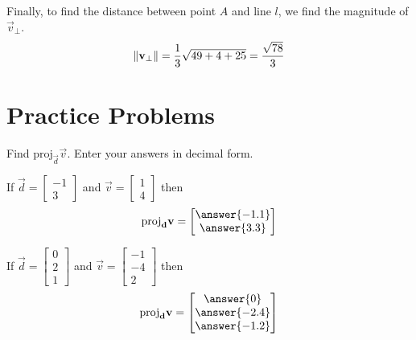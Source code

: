\documentclass{ximera}
\begin{document}
\begin{example}
\begin{explanation}
\begin{image}[2in]
\end{image}


Finally, to find the distance between point $A$ and line $l$, we find the magnitude of $\vec{v}_{\perp}$.
$$\left\lVert{\bf v}_{\perp}\right\rVert=\frac{1}{3}\sqrt{49+4+25}=\frac{\sqrt{78}}{3}$$
\end{explanation}
\end{example}

\section*{Practice Problems}
\begin{problem}
Find $\text{proj}_{\vec{d}}\vec{v}$.  Enter your answers in decimal form.
  \begin{problem}
  If $\vec{d}=\begin{bmatrix}-1\\3\end{bmatrix}$ and $\vec{v}=\begin{bmatrix}1\\4\end{bmatrix}$ then
  $$\text{proj}_{\vec{d}}\vec{v}=\begin{bmatrix}\answer{-1.1}\\\answer{3.3}\end{bmatrix}$$
    \end{problem}
    \begin{problem}
    If $\vec{d}=\begin{bmatrix}0\\2\\1\end{bmatrix}$ and $\vec{v}=\begin{bmatrix}-1\\-4\\2\end{bmatrix}$ then
    $$\text{proj}_{\vec{d}}\vec{v}=\begin{bmatrix}\answer{0}\\\answer{-2.4}\\\answer{-1.2}\end{bmatrix}$$
    \end{problem}
\end{problem}
\end{document}
